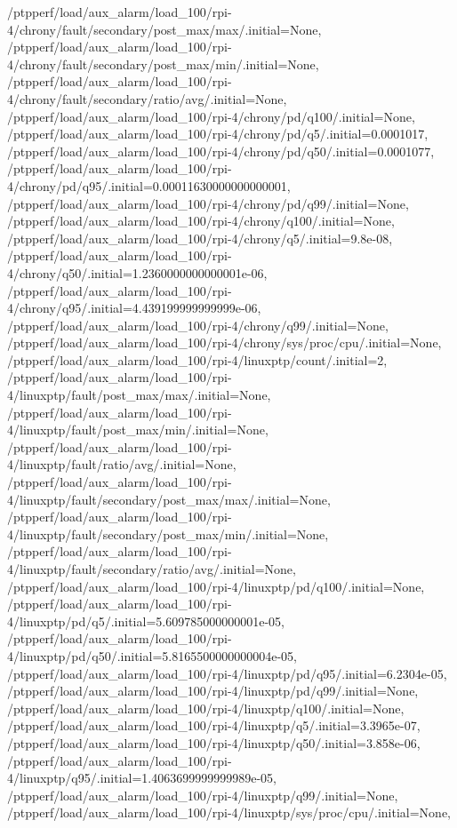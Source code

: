{    /ptpperf/load/aux_alarm/load_100/rpi-4/chrony/fault/secondary/post_max/max/.initial=None,
    /ptpperf/load/aux_alarm/load_100/rpi-4/chrony/fault/secondary/post_max/min/.initial=None,
    /ptpperf/load/aux_alarm/load_100/rpi-4/chrony/fault/secondary/ratio/avg/.initial=None,
    /ptpperf/load/aux_alarm/load_100/rpi-4/chrony/pd/q100/.initial=None,
    /ptpperf/load/aux_alarm/load_100/rpi-4/chrony/pd/q5/.initial=0.0001017,
    /ptpperf/load/aux_alarm/load_100/rpi-4/chrony/pd/q50/.initial=0.0001077,
    /ptpperf/load/aux_alarm/load_100/rpi-4/chrony/pd/q95/.initial=0.00011630000000000001,
    /ptpperf/load/aux_alarm/load_100/rpi-4/chrony/pd/q99/.initial=None,
    /ptpperf/load/aux_alarm/load_100/rpi-4/chrony/q100/.initial=None,
    /ptpperf/load/aux_alarm/load_100/rpi-4/chrony/q5/.initial=9.8e-08,
    /ptpperf/load/aux_alarm/load_100/rpi-4/chrony/q50/.initial=1.2360000000000001e-06,
    /ptpperf/load/aux_alarm/load_100/rpi-4/chrony/q95/.initial=4.439199999999999e-06,
    /ptpperf/load/aux_alarm/load_100/rpi-4/chrony/q99/.initial=None,
    /ptpperf/load/aux_alarm/load_100/rpi-4/chrony/sys/proc/cpu/.initial=None,
    /ptpperf/load/aux_alarm/load_100/rpi-4/linuxptp/count/.initial=2,
    /ptpperf/load/aux_alarm/load_100/rpi-4/linuxptp/fault/post_max/max/.initial=None,
    /ptpperf/load/aux_alarm/load_100/rpi-4/linuxptp/fault/post_max/min/.initial=None,
    /ptpperf/load/aux_alarm/load_100/rpi-4/linuxptp/fault/ratio/avg/.initial=None,
    /ptpperf/load/aux_alarm/load_100/rpi-4/linuxptp/fault/secondary/post_max/max/.initial=None,
    /ptpperf/load/aux_alarm/load_100/rpi-4/linuxptp/fault/secondary/post_max/min/.initial=None,
    /ptpperf/load/aux_alarm/load_100/rpi-4/linuxptp/fault/secondary/ratio/avg/.initial=None,
    /ptpperf/load/aux_alarm/load_100/rpi-4/linuxptp/pd/q100/.initial=None,
    /ptpperf/load/aux_alarm/load_100/rpi-4/linuxptp/pd/q5/.initial=5.609785000000001e-05,
    /ptpperf/load/aux_alarm/load_100/rpi-4/linuxptp/pd/q50/.initial=5.8165500000000004e-05,
    /ptpperf/load/aux_alarm/load_100/rpi-4/linuxptp/pd/q95/.initial=6.2304e-05,
    /ptpperf/load/aux_alarm/load_100/rpi-4/linuxptp/pd/q99/.initial=None,
    /ptpperf/load/aux_alarm/load_100/rpi-4/linuxptp/q100/.initial=None,
    /ptpperf/load/aux_alarm/load_100/rpi-4/linuxptp/q5/.initial=3.3965e-07,
    /ptpperf/load/aux_alarm/load_100/rpi-4/linuxptp/q50/.initial=3.858e-06,
    /ptpperf/load/aux_alarm/load_100/rpi-4/linuxptp/q95/.initial=1.4063699999999989e-05,
    /ptpperf/load/aux_alarm/load_100/rpi-4/linuxptp/q99/.initial=None,
    /ptpperf/load/aux_alarm/load_100/rpi-4/linuxptp/sys/proc/cpu/.initial=None,
}
